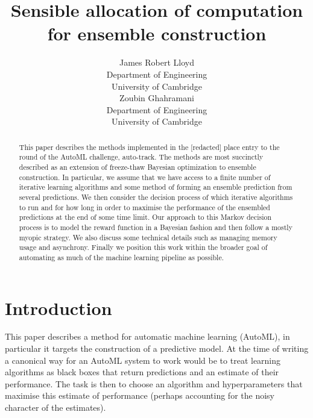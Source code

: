 \documentclass{article} %
\title{Sensible allocation of computation\\for ensemble construction}
\author{
James Robert Lloyd\\
Department of Engineering\\
University of Cambridge\\
\And
Zoubin Ghahramani\\
Department of Engineering\\
University of Cambridge\\
}
\begin{document}
\def\ParamSpace{\Theta}
\def\Param{\theta}
\def\Observation{y}
\def\ObservationVector{Y}
\def\ObservationSpace{\mathcal{Y}}
\def\Func{f}
\def\FuncTime{g}
\def\Noise{\varepsilon}
\def\Input{x}
\def\InputVector{X}
\def\InputSpace{\mathcal{X}}

\maketitle


\begin{abstract} 
This paper describes the methods implemented in the [redacted] place entry to the  round of the AutoML challenge, auto-track.
The methods are most succinctly described as an extension of freeze-thaw Bayesian optimization to ensemble construction.
In particular, we assume that we have access to a finite number of iterative learning algorithms and some method of forming an ensemble prediction from several predictions.
We then consider the decision process of which iterative algorithms to run and for how long in order to maximise the performance of the ensembled predictions at the end of some time limit.
Our approach to this Markov decision process is to model the reward function in a Bayesian fashion and then follow a mostly myopic strategy.
We also discuss some technical details such as managing memory usage and asynchrony.
Finally we position this work within the broader goal of automating as much of the machine learning pipeline as possible.
\end{abstract} 

\allowdisplaybreaks


\section{Introduction}

This paper describes a method for automatic machine learning (AutoML), in particular it targets the construction of a predictive model.
At the time of writing a canonical way for an AutoML system to work would be to treat learning algorithms as black boxes that return predictions and an estimate of their performance.
The task is then to choose an algorithm and hyperparameters that maximise this estimate of performance (perhaps accounting for the noisy character of the estimates).
\end{document}
